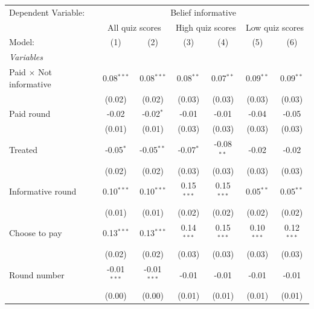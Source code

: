\begingroup
\centering
\begin{tabular}{lcccccc}
   \tabularnewline \midrule \midrule
   Dependent Variable: & \multicolumn{6}{c}{Belief informative}\\
    & \multicolumn{2}{c}{All quiz scores} & \multicolumn{2}{c}{High quiz scores} & \multicolumn{2}{c}{Low quiz scores} \\ 
   Model:                         & (1)           & (2)           & (3)          & (4)          & (5)          & (6)\\  
   \midrule
   \emph{Variables}\\
   Paid $\times$ Not informative  & 0.08$^{***}$  & 0.08$^{***}$  & 0.08$^{**}$  & 0.07$^{**}$  & 0.09$^{**}$  & 0.09$^{**}$\\   
                                  & (0.02)        & (0.02)        & (0.03)       & (0.03)       & (0.03)       & (0.03)\\   
   Paid round                     & -0.02         & -0.02$^{*}$   & -0.01        & -0.01        & -0.04        & -0.05\\   
                                  & (0.01)        & (0.01)        & (0.03)       & (0.03)       & (0.03)       & (0.03)\\   
   Treated                        & -0.05$^{*}$   & -0.05$^{**}$  & -0.07$^{*}$  & -0.08$^{**}$ & -0.02        & -0.02\\   
                                  & (0.02)        & (0.02)        & (0.03)       & (0.03)       & (0.03)       & (0.03)\\   
   Informative round              & 0.10$^{***}$  & 0.10$^{***}$  & 0.15$^{***}$ & 0.15$^{***}$ & 0.05$^{**}$  & 0.05$^{**}$\\   
                                  & (0.01)        & (0.01)        & (0.02)       & (0.02)       & (0.02)       & (0.02)\\   
   Choose to pay                  & 0.13$^{***}$  & 0.13$^{***}$  & 0.14$^{***}$ & 0.15$^{***}$ & 0.10$^{***}$ & 0.12$^{***}$\\   
                                  & (0.02)        & (0.02)        & (0.03)       & (0.03)       & (0.03)       & (0.03)\\   
   Round number                   & -0.01$^{***}$ & -0.01$^{***}$ & -0.01        & -0.01        & -0.01        & -0.01\\   
                                  & (0.00)        & (0.00)        & (0.01)       & (0.01)       & (0.01)       & (0.01)\\   

\end{tabular}

